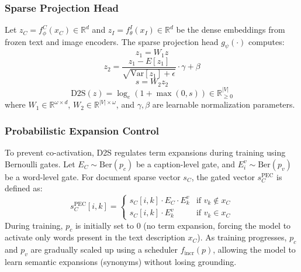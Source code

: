 \documentclass[11pt,a4paper]{article}
\begin{document}
\subsubsection{Sparse Projection Head}
Let $z_C = f_{\phi}^C(x_C) \in \mathbb{R}^d$ and $z_I = f_{\theta}^I(x_I) \in \mathbb{R}^d$ be the dense embeddings from frozen text and image encoders. The sparse projection head $g_{\psi}(\cdot)$ computes:
\begin{equation}
z_1 = W_1 z
\end{equation}
\begin{equation}
z_2 = \frac{z_1 - E[z_1]}{\sqrt{\text{Var}[z_1] + \epsilon}} \cdot \gamma + \beta
\end{equation}
\begin{equation}
s = W_2 z_2
\end{equation}
\begin{equation}
\text{D2S}(z) = \log_e(1 + \max(0, s)) \in \mathbb{R}^{|V|}_{\geq 0}
\end{equation}
where $W_1 \in \mathbb{R}^{\omega \times d}$, $W_2 \in \mathbb{R}^{|V| \times \omega}$, and $\gamma, \beta$ are learnable normalization parameters.

\subsubsection{Probabilistic Expansion Control}
To prevent co-activation, D2S regulates term expansions during training using Bernoulli gates. Let $E_C \sim \text{Ber}(p_c)$ be a caption-level gate, and $E^v_i \sim \text{Ber}(p_v)$ be a word-level gate. For document sparse vector $s_C$, the gated vector $s_C^{\text{PEC}}$ is defined as:
\begin{equation}
s_C^{\text{PEC}}[i, k] = \begin{cases}
s_C[i, k] \cdot E_C \cdot E^v_k & \text{if } v_k \notin x_C \\
s_C[i, k] \cdot E^v_k & \text{if } v_k \in x_C
\end{cases}
\end{equation}
During training, $p_c$ is initially set to 0 (no term expansion, forcing the model to activate only words present in the text description $x_C$). As training progresses, $p_c$ and $p_v$ are gradually scaled up using a scheduler $f_{\text{incr}}(p)$, allowing the model to learn semantic expansions (synonyms) without losing grounding.
\end{document}
